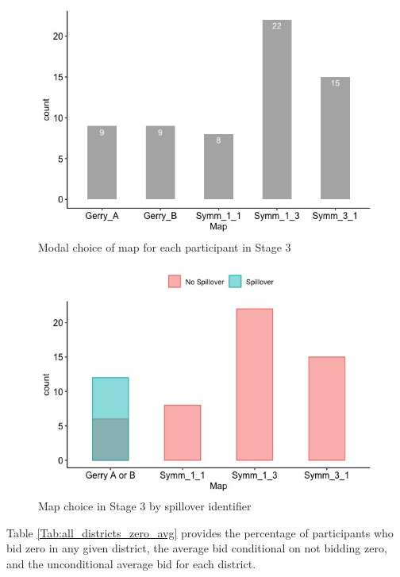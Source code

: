 \documentclass[AER]{AEA}
\begin{document}
\begin{figure}[!h]
\centering
\includegraphics[scale=0.5]{map_choice_stage_3.jpeg}
\caption{Modal choice of map for each participant in Stage 3}
\label{fig:map_choice_stage_3}
\end{figure}

\begin{figure}[!h]
\centering
\includegraphics[scale=0.5]{spillover_unadjusted.jpeg}
\caption{Map choice in Stage 3 by spillover identifier}
\label{fig:spillover_unadjusted}
\end{figure}

Table \ref{Tab:all_districts_zero_avg} provides the percentage of participants who bid zero in any given district, the average bid conditional on not bidding zero, and the unconditional average bid for each district.
\end{document}
